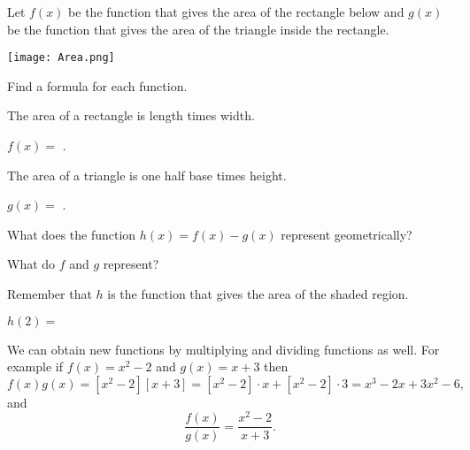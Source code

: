 \documentclass{ximera}
\begin{document}
\begin{question}
Let $f(x)$ be the function that gives the area of the rectangle below and $g(x)$ be the function that gives the area of the triangle inside the rectangle. 
\begin{image}
\texttt{[image: Area.png]}
\end{image}

Find a formula for each function.


\begin{hint}
The area of a rectangle is length times width.
\end{hint}
\begin{prompt}
$f(x)=$ .
\end{prompt}

\begin{hint}
The area of a triangle is one half base times height.
\end{hint}
\begin{prompt}
$g(x)=$ .
\end{prompt}

What does the function $h(x)=f(x)-g(x)$ represent geometrically?
\begin{hint}
What do $f$ and $g$ represent? 
\end{hint}
\begin{multipleChoice}
\end{multipleChoice}

\begin{hint}
Remember that $h$ is the function that gives the area of the shaded region. 
\end{hint}
\begin{prompt}
$h(2)=$ 
\end{prompt}
\end{question}

We can obtain new functions by multiplying and dividing functions as well. 
For example if $f(x)=x^2-2$ and $g(x)=x+3$ then 
\[
f(x)g(x)=[x^2-2][x+3]=[x^2-2]\cdot x+[x^2-2]\cdot 3=x^3-2x+3x^2-6,
\]
and
\[
\frac{f(x)}{g(x)}=\frac{x^2-2}{x+3}.
\]
\end{document}
